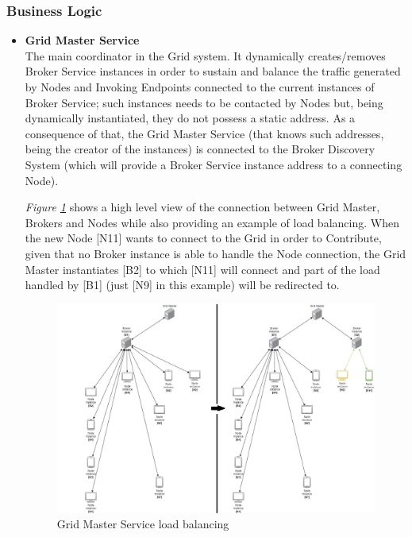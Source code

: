 \subsubsection{Business Logic}
\begin{itemize}
    \item \textbf{Grid Master Service}\\
    The main coordinator in the Grid system. It dynamically creates/removes Broker Service instances in order to sustain and balance the traffic generated by Nodes and Invoking Endpoints connected to the current instances of Broker Service; such instances needs to be contacted by Nodes but, being dynamically instantiated, they do not possess a static address. As a consequence of that, the Grid Master Service (that knows such addresses, being the creator of the instances) is connected to the Broker Discovery System (which will provide a Broker Service instance address to a connecting Node).

    \textit{Figure \ref{fig:master_grid_load_balancing}} shows a high level view of the connection between Grid Master, Brokers and Nodes while also providing an example of load balancing. When the new Node [N11] wants to connect to the Grid in order to Contribute, given that no Broker instance is able to handle the Node connection, the Grid Master instantiates [B2] to which [N11] will connect and part of the load handled by [B1] (just [N9] in this example) will be redirected to.
    \begin{figure}[!ht]
        \centering
        \includegraphics[width=\linewidth]{document/chapters/chapter_6/images/master_grid_load_balancing.jpg}
        \caption{Grid Master Service load balancing}
        \label{fig:master_grid_load_balancing}
    \end{figure}


\end{itemize}
